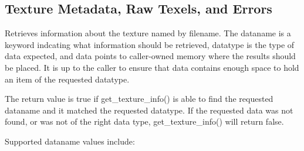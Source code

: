 \newpage
\subsection{Texture Metadata, Raw Texels, and Errors}
\label{sec:texturesys:api:get_texture_info}
\label{sec:texturesys:api:get_imagespec}
\label{sec:texturesys:api:geterror}


Retrieves information about the texture named by {\cf filename}.
The {\cf dataname} is a keyword indcating what information should
be retrieved, {\cf datatype} is the type of data expected, and
{\cf data} points to caller-owned memory where the results should be
placed.  It is up to the caller to ensure that {\cf data} contains
enough space to hold an item of the requested {\cf datatype}.

The return value is {\cf true} if {\cf get_texture_info()} is able
to find the requested {\cf dataname} and it matched the requested
{\cf datatype}.  If the requested data was not found, or was not
of the right data type, {\cf get_texture_info()} will return {\cf false}.

Supported {\cf dataname} values include:

